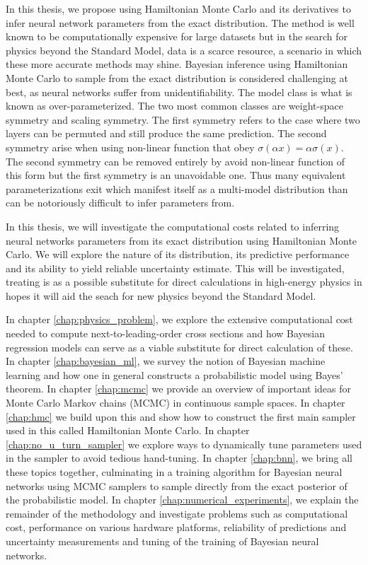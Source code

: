 In this thesis, we propose using Hamiltonian Monte Carlo and its derivatives to infer neural network parameters from the exact distribution. The method is well known to be computationally expensive for large datasets but in the search for physics beyond the Standard Model, data is a scarce resource, a scenario in which these more accurate methods may shine. Bayesian inference using Hamiltonian Monte Carlo to sample from the exact distribution is considered challenging at best, as neural networks suffer from unidentifiability. The model class is what is known as over-parameterized. The two most common classes are weight-space symmetry and scaling symmetry. The first symmetry refers to the case where two layers can be permuted and still produce the same prediction. The second symmetry arise when using non-linear function that obey $\sigma(\alpha x) = \alpha\sigma(x)$. The second symmetry can be removed entirely by avoid non-linear function of this form but the first symmetry is an unavoidable one. Thus many equivalent parameterizations exit which manifest itself as a multi-model distribution than can be notoriously difficult to infer parameters from.

In this thesis, we will investigate the computational costs related to inferring neural networks parameters from its exact distribution using Hamiltonian Monte Carlo. We will explore the nature of its distribution, its predictive performance and its ability to yield reliable uncertainty estimate. This will be investigated, treating is as a possible substitute for direct calculations in high-energy physics in hopes it will aid the seach for new physics beyond the Standard Model.

In chapter \ref{chap:physics_problem}, we explore the extensive computational cost needed to compute next-to-leading-order cross sections and how Bayesian regression models can serve as a viable substitute for direct calculation of these. In chapter \ref{chap:bayesian_ml}, we survey the notion of Bayesian machine learning and how one in general constructs a probabilistic model using Bayes' theorem. In chapter \ref{chap:mcmc} we provide an overview of important ideas for Monte Carlo Markov chains (MCMC) in continuous sample spaces. In chapter \ref{chap:hmc} we build upon this and show how to construct the first main sampler used in this called Hamiltonian Monte Carlo. In chapter \ref{chap:no_u_turn_sampler} we explore ways to dynamically tune parameters used in the sampler to avoid tedious hand-tuning. In chapter \ref{chap:bnn}, we bring all these topics together, culminating in a training algorithm for Bayesian neural networks using MCMC samplers to sample directly from the exact posterior of the probabilistic model. In chapter \ref{chap:numerical_experiments}, we explain the remainder of the methodology and investigate problems such as computational cost, performance on various hardware platforms, reliability of predictions and uncertainty measurements and tuning of the training of Bayesian neural networks.
